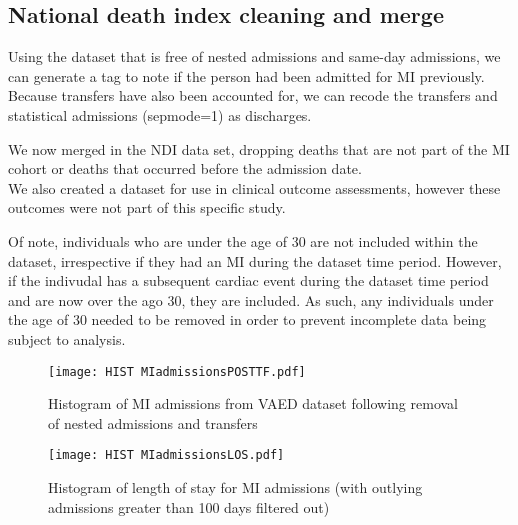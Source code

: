 \documentclass[11pt]{article}
\begin{document}
\subsection{National death index cleaning and merge}
Using the dataset that is free of nested admissions and same-day admissions, we can generate a tag to note if the person had been admitted for MI previously. Because transfers have also been accounted for, we can recode the transfers and statistical admissions (sepmode=1) as discharges.
\color{violet}
\begin{stlog}\end{stlog}
\color{black}
We now merged in the NDI data set, dropping deaths that are not part of the MI cohort or deaths that occurred before the admission date. \\
We also created a dataset for use in clinical outcome assessments, however these outcomes were not part of this specific study. 
\color{violet}
\begin{stlog}\end{stlog}
\color{black}
Of note, individuals who are under the age of 30 are not included within the dataset, irrespective if they had an MI during the dataset time period. However, if the indivudal has a subsequent cardiac event during the dataset time period and are now over the ago 30, they are included. As such, any individuals under the age of 30 needed to be removed in order to prevent incomplete data being subject to analysis. 
\color{violet}
\begin{stlog}\end{stlog}
\color{black}
\begin{figure} [h]
	\centering
	\texttt{[image: HIST MIadmissionsPOSTTF.pdf]}
	\caption{Histogram of MI admissions from VAED dataset following removal of nested admissions and transfers}
	\label{MI admissions POSTTF}
\end{figure}
\color{violet}
\begin{stlog}\end{stlog}
\color{black}
\begin{figure} 
	\centering
	\texttt{[image: HIST MIadmissionsLOS.pdf]}
	\caption{Histogram of length of stay for MI admissions (with outlying admissions greater than 100 days filtered out)}
	\label{MI admissions LOS}
\end{figure}
\color{violet}
\begin{stlog}\end{stlog}
\color{black}
\end{document}
